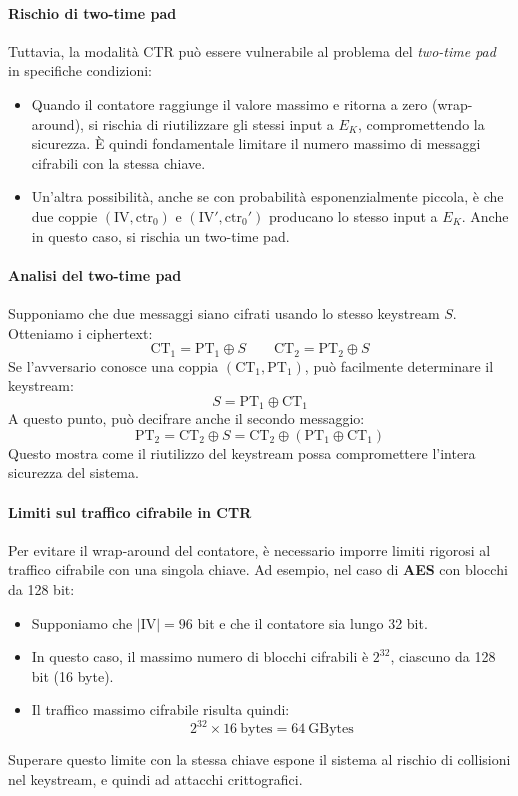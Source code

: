 \documentclass{report}
\begin{document}
\paragraph{Rischio di two-time pad}
Tuttavia, la modalità CTR può essere vulnerabile al problema del \textit{two-time pad} in specifiche condizioni:
\begin{itemize}
    \item Quando il contatore raggiunge il valore massimo e ritorna a zero (wrap-around), si rischia di riutilizzare gli stessi input a \( E_K \), compromettendo la sicurezza. È quindi fondamentale limitare il numero massimo di messaggi cifrabili con la stessa chiave.
    \item Un'altra possibilità, anche se con probabilità esponenzialmente piccola, è che due coppie \((\text{IV}, \text{ctr}_0)\) e \((\text{IV}', \text{ctr}_0')\) producano lo stesso input a \( E_K \). Anche in questo caso, si rischia un two-time pad.
\end{itemize}

\paragraph{Analisi del two-time pad}
Supponiamo che due messaggi siano cifrati usando lo stesso keystream \( S \). Otteniamo i ciphertext:
\[
\text{CT}_1 = \text{PT}_1 \oplus S \qquad \text{CT}_2 = \text{PT}_2 \oplus S
\]
Se l’avversario conosce una coppia \((\text{CT}_1, \text{PT}_1)\), può facilmente determinare il keystream:
\[
S = \text{PT}_1 \oplus \text{CT}_1
\]
A questo punto, può decifrare anche il secondo messaggio:
\[
\text{PT}_2 = \text{CT}_2 \oplus S = \text{CT}_2 \oplus (\text{PT}_1 \oplus \text{CT}_1)
\]
Questo mostra come il riutilizzo del keystream possa compromettere l'intera sicurezza del sistema.

\paragraph{Limiti sul traffico cifrabile in CTR}
Per evitare il wrap-around del contatore, è necessario imporre limiti rigorosi al traffico cifrabile con una singola chiave. Ad esempio, nel caso di \textbf{AES} con blocchi da 128 bit:
\begin{itemize}
    \item Supponiamo che \( |\text{IV}| = 96 \) bit e che il contatore sia lungo 32 bit.
    \item In questo caso, il massimo numero di blocchi cifrabili è \( 2^{32} \), ciascuno da 128 bit (16 byte).
    \item Il traffico massimo cifrabile risulta quindi:
    \[
    2^{32} \times 16\ \text{bytes} = 64\ \text{GBytes}
    \]
\end{itemize}
Superare questo limite con la stessa chiave espone il sistema al rischio di collisioni nel keystream, e quindi ad attacchi crittografici.
\end{document}

